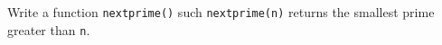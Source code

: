 Write a function \texttt{nextprime()} such \texttt{nextprime(n)} returns the smallest prime greater than \texttt{n}.

